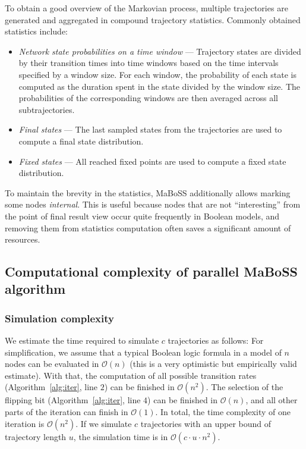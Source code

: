 \documentclass[sn-mathphys-num]{sn-jnl}%
\begin{document}
To obtain a good overview of the Markovian process, multiple trajectories are generated and aggregated in compound trajectory statistics. Commonly obtained statistics include:
\begin{itemize}
    \item \emph{Network state probabilities on a time window} --- Trajectory states are divided by their transition times into time windows based on the time intervals specified by a window size. For each window, the probability of each state is computed as the duration spent in the state divided by the window size. The probabilities of the corresponding windows are then averaged across all subtrajectories.
    \item \emph{Final states} --- The last sampled states from the trajectories are used to compute a final state distribution.
    \item \emph{Fixed states} --- All reached fixed points are used to compute a fixed state distribution.
\end{itemize}

To maintain the brevity in the statistics, MaBoSS additionally allows marking some nodes \emph{internal}.
This is useful because nodes that are not ``interesting'' from the point of final result view occur quite frequently in Boolean models, and removing them from statistics computation often saves a significant amount of resources.

\subsection{Computational complexity of parallel MaBoSS algorithm}

\subsubsection{Simulation complexity}

We estimate the time required to simulate $c$ trajectories as follows:
For simplification, we assume that a typical Boolean logic formula in a model of $n$ nodes can be evaluated in $\mathcal{O}(n)$ (this is a very optimistic but empirically valid estimate). With that, the computation of all possible transition rates (Algorithm~\ref{alg:iter}, line $2$) can be finished in $\mathcal{O}(n^2)$. The selection of the flipping bit (Algorithm~\ref{alg:iter}, line $4$) can be finished in $\mathcal{O}(n)$, and all other parts of the iteration can finish in $\mathcal{O}(1)$. In total, the time complexity of one iteration is $\mathcal{O}(n^2)$. If we simulate $c$ trajectories with an upper bound of trajectory length $u$, the simulation time is in $\mathcal{O}(c \cdot u \cdot n^2)$.
\end{document}
